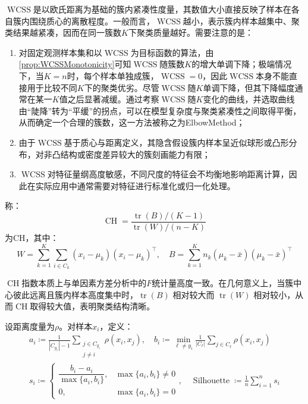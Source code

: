 \begin{note}
	$\operatorname{WCSS}$是以欧氏距离为基础的簇内紧凑性度量，其数值大小直接反映了样本在各自簇内围绕质心的离散程度。一般而言，$\operatorname{WCSS}$越小，表示簇内样本越集中、聚类结果越紧凑，因而在同一簇数$K$下聚类质量越好。需要注意的是：
	\begin{enumerate}
		\item 对固定观测样本集和以$\operatorname{WCSS}$为目标函数的算法，由\cref{prop:WCSSMonotonicity}可知$\operatorname{WCSS}$随簇数$K$的增大单调下降；极端情况下，当$K=n$时，每个样本单独成簇，$\operatorname{WCSS}=0$，因此$\operatorname{WCSS}$本身不能直接用于比较不同$K$下的聚类优劣。尽管$\operatorname{WCSS}$随$K$单调下降，但其下降幅度通常在某一$K$值之后显著减缓。通过考察$\operatorname{WCSS}$随$K$变化的曲线，并选取曲线由“陡降”转为“平缓”的拐点，可以在模型复杂度与聚类紧凑性之间取得平衡，从而确定一个合理的簇数，这一方法被称之为\gls{ElbowMethod}；
		\item 由于$\operatorname{WCSS}$基于质心与距离定义，其隐含假设簇内样本呈近似球形或凸形分布，对非凸结构或密度差异较大的簇刻画能力有限；
		\item $\operatorname{WCSS}$对特征量纲高度敏感，不同尺度的特征会不均衡地影响距离计算，因此在实际应用中通常需要对特征进行标准化或归一化处理。
	\end{enumerate}
\end{note}
\begin{definition}
	称：
	\begin{equation*}
		\operatorname{CH}=\frac{\operatorname{tr}(B)/(K-1)}{\operatorname{tr}(W)/(n-K)}
	\end{equation*}
	为\gls{CH}，其中：
	\begin{equation*}
		W=\sum_{k=1}^K\sum_{i\in C_k}(x_i-\mu_k)(x_i-\mu_k)^{\top},\quad
		B=\sum_{k=1}^K n_k(\mu_k-\bar{x})(\mu_k-\bar{x})^{\top}
	\end{equation*}
\end{definition}
\begin{note}
	$\operatorname{CH}$指数本质上与单因素方差分析中的$F$统计量高度一致。在几何意义上，当簇中心彼此远离且簇内样本高度集中时，$\operatorname{tr}(B)$ 相对较大而 $\operatorname{tr}(W)$ 相对较小，从而$\operatorname{CH}$取得较大值，表明聚类结构清晰。
\end{note}
\begin{definition}
	设距离度量为$\rho$。对样本$x_i$，定义：
	\begin{gather*}
		a_i\coloneq\frac{1}{|C_{y_i}|-1}\sum_{\substack{j\in C_{y_i}\\ j\neq i}}\rho(x_i,x_j),\quad b_i\coloneq\min_{\ell\neq y_i}\frac{1}{|C_{\ell}|}\sum_{j\in C_{\ell}}\rho(x_i,x_j) \\
		s_i\coloneq
		\begin{cases}
			\dfrac{b_i-a_i}{\max\{a_i,b_i\}},&\max\{a_i,b_i\}\ne0 \\
			0,&\max\{a_i,b_i\}=0
		\end{cases},\quad\operatorname{Silhouette}\coloneq\frac{1}{n}\sum_{i=1}^ns_i
	\end{gather*}
\end{definition}
